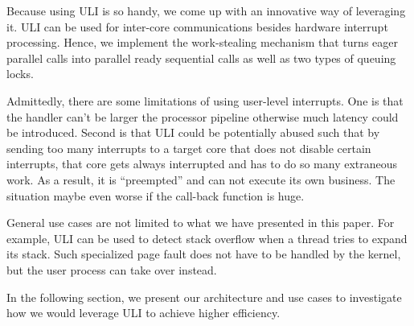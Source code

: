 Because using ULI is so handy, we come up with an innovative way of leveraging it. ULI can be used for inter-core communications besides hardware interrupt processing. Hence, we implement the work-stealing mechanism that turns eager parallel calls into parallel ready sequential calls as well as two types of queuing locks. 

Admittedly, there are some limitations of using user-level interrupts. One is that the handler can't be larger the processor pipeline otherwise much latency could be introduced. Second is that ULI could be potentially abused such that by sending too many interrupts to a target core that does not disable certain interrupts, that core gets always interrupted and has to do so many extraneous work. As a result, it is ``preempted'' and can not execute its own business. The situation maybe even worse if the call-back function is huge.

General use cases are not limited to what we have presented in this paper. For example, ULI can be used to detect stack overflow when a thread tries to expand its stack. Such specialized page fault does not have to be handled by the kernel, but the user process can take over instead. 

In the following section, we present our architecture and use cases to investigate how we would leverage ULI to achieve higher efficiency. 

